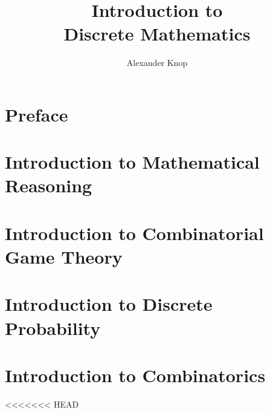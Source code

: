 

\title{ Introduction to \\Discrete Mathematics}
\author{Alexander Knop}


  \maketitle

  \frontmatter

  \tableofcontents

  \markboth{\nomname}{\nomname}
  \printnomenclature

  \part*{Preface}
  

  \mainmatter

  \part{Introduction to Mathematical Reasoning}
  \label{part:mathematical-reasoning}
  
  
  
  
  
  
  
  
  

  \part{Introduction to Combinatorial Game Theory}
  \label{part:combinatorial-games}
  
  
  
  

  \part{Introduction to Discrete Probability}
  \label{part:probability}
  
  
  

  \part{Introduction to Combinatorics}
  \label{part:combinatorics}
<<<<<<< HEAD
  
  
  
  
  
  
  

